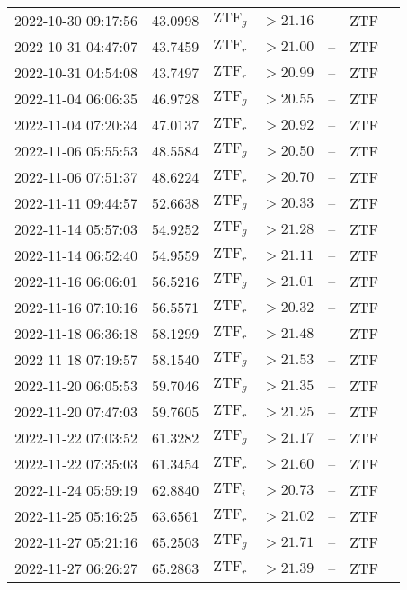 \documentclass{nature_plusfigure}
\begin{document}
\begin{supplement}
\begin{center}
\begin{longtable}{lllllll}
2022-10-30 09:17:56 & 43.0998 & $\mathrm{ZTF}_{g}$ & $>21.16$ & -- & ZTF &  \\ 
2022-10-31 04:47:07 & 43.7459 & $\mathrm{ZTF}_{r}$ & $>21.00$ & -- & ZTF &  \\ 
2022-10-31 04:54:08 & 43.7497 & $\mathrm{ZTF}_{r}$ & $>20.99$ & -- & ZTF &  \\ 
2022-11-04 06:06:35 & 46.9728 & $\mathrm{ZTF}_{g}$ & $>20.55$ & -- & ZTF &  \\ 
2022-11-04 07:20:34 & 47.0137 & $\mathrm{ZTF}_{r}$ & $>20.92$ & -- & ZTF &  \\ 
2022-11-06 05:55:53 & 48.5584 & $\mathrm{ZTF}_{g}$ & $>20.50$ & -- & ZTF &  \\ 
2022-11-06 07:51:37 & 48.6224 & $\mathrm{ZTF}_{r}$ & $>20.70$ & -- & ZTF &  \\ 
2022-11-11 09:44:57 & 52.6638 & $\mathrm{ZTF}_{g}$ & $>20.33$ & -- & ZTF &  \\ 
2022-11-14 05:57:03 & 54.9252 & $\mathrm{ZTF}_{g}$ & $>21.28$ & -- & ZTF &  \\ 
2022-11-14 06:52:40 & 54.9559 & $\mathrm{ZTF}_{r}$ & $>21.11$ & -- & ZTF &  \\ 
2022-11-16 06:06:01 & 56.5216 & $\mathrm{ZTF}_{g}$ & $>21.01$ & -- & ZTF &  \\ 
2022-11-16 07:10:16 & 56.5571 & $\mathrm{ZTF}_{r}$ & $>20.32$ & -- & ZTF &  \\ 
2022-11-18 06:36:18 & 58.1299 & $\mathrm{ZTF}_{r}$ & $>21.48$ & -- & ZTF &  \\ 
2022-11-18 07:19:57 & 58.1540 & $\mathrm{ZTF}_{g}$ & $>21.53$ & -- & ZTF &  \\ 
2022-11-20 06:05:53 & 59.7046 & $\mathrm{ZTF}_{g}$ & $>21.35$ & -- & ZTF &  \\ 
2022-11-20 07:47:03 & 59.7605 & $\mathrm{ZTF}_{r}$ & $>21.25$ & -- & ZTF &  \\ 
2022-11-22 07:03:52 & 61.3282 & $\mathrm{ZTF}_{g}$ & $>21.17$ & -- & ZTF &  \\ 
2022-11-22 07:35:03 & 61.3454 & $\mathrm{ZTF}_{r}$ & $>21.60$ & -- & ZTF &  \\ 
2022-11-24 05:59:19 & 62.8840 & $\mathrm{ZTF}_{i}$ & $>20.73$ & -- & ZTF &  \\ 
2022-11-25 05:16:25 & 63.6561 & $\mathrm{ZTF}_{r}$ & $>21.02$ & -- & ZTF &  \\ 
2022-11-27 05:21:16 & 65.2503 & $\mathrm{ZTF}_{g}$ & $>21.71$ & -- & ZTF &  \\ 
2022-11-27 06:26:27 & 65.2863 & $\mathrm{ZTF}_{r}$ & $>21.39$ & -- & ZTF &  \\ 

\end{longtable}
\end{center}
\end{supplement}
\end{document}
